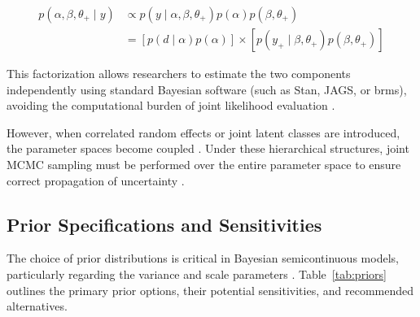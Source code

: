 \documentclass[11pt, a4paper]{article}
\begin{document}
\begin{align}
p(\alpha, \beta, \theta_+ \mid y) &\propto p(y \mid \alpha, \beta, \theta_+) p(\alpha) p(\beta, \theta_+) \nonumber \\
&= \left[ p(d \mid \alpha) p(\alpha) \right] \times \left[ p(y_+ \mid \beta, \theta_+) p(\beta, \theta_+) \right]
\end{align}

This factorization allows researchers to estimate the two components independently using standard Bayesian software (such as Stan, JAGS, or brms), avoiding the computational burden of joint likelihood evaluation \cite{ref22, ref35, ref36}.

However, when correlated random effects or joint latent classes are introduced, the parameter spaces become coupled \cite{ref1, ref6}. Under these hierarchical structures, joint MCMC sampling must be performed over the entire parameter space to ensure correct propagation of uncertainty \cite{ref1}.

\subsection{Prior Specifications and Sensitivities}
The choice of prior distributions is critical in Bayesian semicontinuous models, particularly regarding the variance and scale parameters \cite{ref19, ref20}. Table~\ref{tab:priors} outlines the primary prior options, their potential sensitivities, and recommended alternatives.
\end{document}
